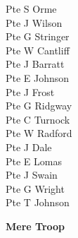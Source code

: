 \begin{multicols}{2}
  Pte S Orme \\
  Pte J Wilson \\
  Pte G Stringer \\
  Pte W Cantliff \\
  Pte J Barratt \\
  Pte E Johnson \\
  Pte J Frost \\
  Pte G Ridgway \\
  Pte C Turnock \\
  Pte W Radford \\
  Pte J Dale \\
  Pte E Lomas \\
  Pte J Swain \\
  Pte G Wright \\
  Pte T Johnson \\
\end{multicols}

\begin{center}
  \Large
  \textbf{Mere Troop}
\end{center}


